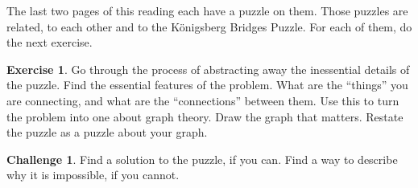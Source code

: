 \documentclass[12pt,letterpaper]{article}
\theoremstyle{definition}
\newtheorem{exercise}[question]{Exercise}
\newtheorem*{challenge}{Challenge}
\begin{document}
The last two pages of this reading each have a puzzle on them. Those puzzles are related, to each other and to the 
K\"{o}nigsberg Bridges Puzzle. For each of them, do the next exercise.

\begin{exercise}
Go through the process of abstracting away the inessential details of the puzzle.
Find the essential features of the problem. What are the ``things'' you are connecting, and what are the ``connections'' between them. Use this to turn the problem into one about graph theory.
Draw the graph that matters. Restate the puzzle as a puzzle about your graph.
\end{exercise}

\begin{challenge}
Find a solution to the puzzle, if you can. Find a way to describe why it is impossible, if you cannot.
\end{challenge}

\clearpage





\end{document}
